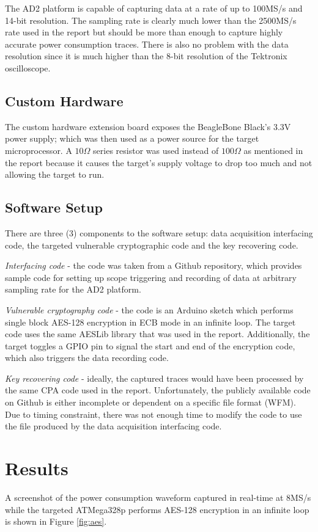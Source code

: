 \documentclass[conference]{IEEEtran}
\begin{document}
The AD2 platform is capable of capturing data at a rate of up to 100MS/s and 14-bit resolution. The sampling rate is clearly much lower than the 2500MS/s rate used in the report but should be more than enough to capture highly accurate power consumption traces. There is also no problem with the data resolution since it is much higher than the 8-bit resolution of the Tektronix oscilloscope.

\subsection{Custom Hardware}
The custom hardware extension board exposes the BeagleBone Black's 3.3V power supply; which was then used as a power source for the target microprocessor. A $10\Omega$ series resistor was used instead of $100\Omega$ as mentioned in the report because it causes the target's supply voltage to drop too much and not allowing the target to run. 

\subsection{Software Setup}
There are three (3) components to the software setup: data acquisition interfacing code, the targeted vulnerable cryptographic code and the key recovering code.

\textit{Interfacing code} - the code was taken from a Github repository, which provides sample code for setting up scope triggering and recording of data at arbitrary sampling rate for the AD2 platform.

\textit{Vulnerable cryptography code} - the code is an Arduino sketch which performs single block AES-128 encryption in ECB mode in an infinite loop. The target code uses the same AESLib library that was used in the report. Additionally, the target toggles a GPIO pin to signal the start and end of the encryption code, which also triggers the data recording code.

\textit{Key recovering code} - ideally, the captured traces would have been processed by the same CPA code used in the report. Unfortunately, the publicly available code on Github is either incomplete or dependent on a specific file format (WFM). Due to timing constraint, there was not enough time to modify the code to use the file produced by the data acquisition interfacing code.

\section{Results}
A screenshot of the power consumption waveform captured in real-time at 8MS/s while the targeted ATMega328p performs AES-128 encryption in an infinite loop is shown in Figure \ref{fig:aes}.
\end{document}
